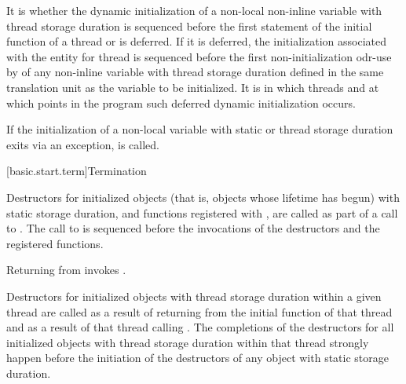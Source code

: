 \pnum
It is 
whether the dynamic initialization of a
non-local non-inline variable with thread storage duration
is sequenced before the first statement of the initial function of a thread or is deferred.
If it is deferred,
the initialization associated with the entity for thread 
is sequenced before the first non-initialization odr-use by 
of any non-inline variable with thread storage duration
defined in the same translation unit as the variable to be initialized.
It is 
in which threads and at which points in the program such deferred dynamic initialization occurs.

\pnum
If the initialization of a non-local variable with static or thread storage duration
exits via
an exception,  is called.%

[basic.start.term]{Termination}

\pnum
{}%
%
%
Destructors for initialized objects
(that is, objects whose lifetime has begun)
with static storage duration,
and functions registered with ,
are called as part of a call to
%
%
.
The call to  is sequenced before
the invocations of the destructors and the registered functions.
\begin{note}
Returning from  invokes .
\end{note}

\pnum
Destructors for initialized objects with thread storage duration within a given thread
are called as a result of returning from the initial function of that thread and as a
result of that thread calling .
The completions of the destructors for all initialized objects with thread storage
duration within that thread strongly happen before the initiation of the destructors of
any object with static storage duration.

